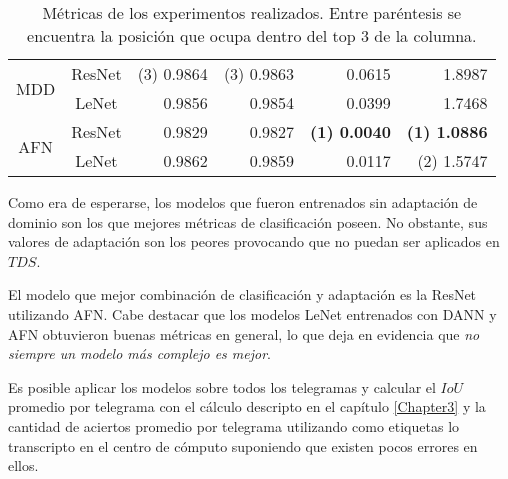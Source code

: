 \begin{table}[H]
\begin{tabular}{cc|rrrr}
        \multirow[c]{2}{*}{MDD}      & ResNet & {\footnotesize (3)} 0.9864          & {\footnotesize (3)} 0.9863          & 0.0615                              & 1.8987                              \\
                                     & LeNet  & 0.9856                              & 0.9854                              & 0.0399                              & 1.7468                              \\\hline
        \multirow[c]{2}{*}{AFN}      & ResNet & 0.9829                              & 0.9827                              & \textbf{{\footnotesize (1)} 0.0040} & \textbf{{\footnotesize (1)} 1.0886} \\
                                     & LeNet  & 0.9862                              & 0.9859                              & 0.0117                              & {\footnotesize (2)} 1.5747          \\

        \bottomrule
    \end{tabular}
    \caption{M\'etricas de los experimentos realizados. Entre par\'entesis se encuentra la posici\'on que ocupa dentro del top 3 de la columna.}
    \label{tab:metricas-experimentos}
\end{table}

Como era de esperarse, los modelos que fueron entrenados sin adaptaci\'on de dominio son los que mejores m\'etricas de
clasificaci\'on poseen. No obstante, sus valores de adaptaci\'on son los peores provocando que no puedan ser aplicados
en $TDS$.

El modelo que mejor combinaci\'on de clasificaci\'on y adaptaci\'on es la ResNet utilizando AFN. Cabe destacar que los
modelos LeNet entrenados con DANN y AFN obtuvieron buenas m\'etricas en general, lo que deja en evidencia que {\it no
        siempre un modelo m\'as complejo es mejor}.

Es posible aplicar los modelos sobre todos los telegramas y calcular el $IoU$ promedio por telegrama con el c\'alculo
descripto en el cap\'itulo \ref{Chapter3} y la cantidad de aciertos promedio por telegrama utilizando como etiquetas lo
transcripto en el centro de c\'omputo suponiendo que existen pocos errores en ellos.

